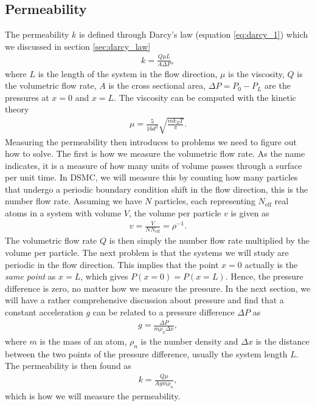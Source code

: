 \subsection{Permeability}
\label{sec:permeability_dsmc}
The permeability $k$ is defined through Darcy's law (equation \eqref{eq:darcy_1}) which we discussed in section \ref{sec:darcy_law}
\begin{align}
	\label{eq:permeability_gas}
	k = \frac{Q \mu L}{A\Delta P},
\end{align}
where $L$ is the length of the system in the flow direction, $\mu$ is the viscosity, $Q$ is the volumetric flow rate, $A$ is the cross sectional area, $\Delta P = P_0 - P_L$ are the pressures at $x=0$ and $x=L$. The viscosity can be computed with the kinetic theory \cite{alexander1998cell}
\begin{align}
	\mu = \frac{5}{16d^2}\sqrt{\frac{mk_B T}{\pi}}.
\end{align}
Measuring the permeability then introduces to problems we need to figure out how to solve. The first is how we measure the volumetric flow rate. As the name indicates, it is a measure of how many units of volume passes through a surface per unit time. In DSMC, we will measure this by counting how many particles that undergo a periodic boundary condition shift in the flow direction, this is the number flow rate. Assuming we have $N$ particles, each representing $N_\text{eff}$ real atoms in a system with volume $V$, the volume per particle $v$ is given as
\begin{align}
 	v = \frac{V}{NN_\text{eff}} = \rho^{-1}.
\end{align} 
The volumetric flow rate $Q$ is then simply the number flow rate multiplied by the volume per particle. The next problem is that the systems we will study are periodic in the flow direction. This implies that the point $x=0$ actually is the \textit{same point} as $x=L$, which gives $P(x=0) = P(x=L)$. Hence, the pressure difference is zero, no matter how we measure the pressure. In the next section, we will have a rather comprehensive discussion about pressure and find that a constant acceleration $g$ can be related to a pressure difference $\Delta P$ as
\begin{align}
	g = \frac{\Delta P}{m\rho_n\Delta x},
\end{align}
where $m$ is the mass of an atom, $\rho_n$ is the number density and $\Delta x$ is the distance between the two points of the pressure difference, usually the system length $L$. The permeability is then found as
\begin{align}
	\label{eq:permeability_measure}
	k = \frac{Q \mu}{Agm\rho_n},
\end{align}
which is how we will measure the permeability.